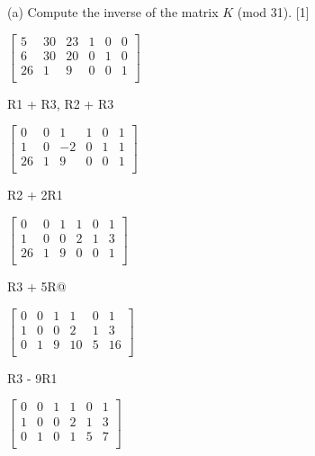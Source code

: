 \documentclass[12pt,emtex]{article}
\begin{document}
\begin{enumerate}
            
             \medskip
        
            (a)	Compute the inverse of the matrix $K$ (mod 31).					\hfill     [1]

            $
            \left[
            	\begin{array}{ccc|ccc}
                    5	&	30	& 23 & 1 & 0 & 0 \\
                    6	&	30	& 20 & 0 & 1 & 0 \\
                    26 & 1 &	9 & 0 & 0 & 1 \\
                \end{array}
            \right]
            $

            R1 + R3, R2 + R3

            $
            \left[
            	\begin{array}{ccc|ccc}
                    0	&	0	& 1 & 1 & 0 & 1 \\
                    1	&	0	& -2 & 0 & 1 & 1 \\
                    26 & 1 &	9 & 0 & 0 & 1 \\
                \end{array}
            \right]
            $

            R2 + 2R1
            
            $
            \left[
            	\begin{array}{ccc|ccc}
                    0	&	0	& 1 & 1 & 0 & 1 \\
                    1	&	0	& 0 & 2 & 1 & 3 \\
                    26 & 1 &	9 & 0 & 0 & 1 \\
                \end{array}
            \right]
            $

            R3 + 5R@
            
            $
            \left[
            	\begin{array}{ccc|ccc}
                    0	&	0	& 1 & 1 & 0 & 1 \\
                    1	&	0	& 0 & 2 & 1 & 3 \\
                    0 & 1 &	9 & 10 & 5 & 16 \\
                \end{array}
            \right]
            $

            R3 - 9R1

            $
            \left[
            	\begin{array}{ccc|ccc}
                    0	&	0	& 1 & 1 & 0 & 1 \\
                    1	&	0	& 0 & 2 & 1 & 3 \\
                    0 & 1 &	0 & 1 & 5 & 7 \\
                \end{array}
            \right]
            $


\end{enumerate}
\end{document}
